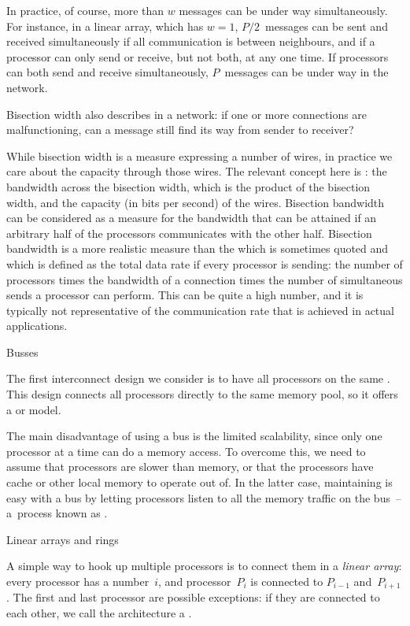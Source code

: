 In practice, of course, more than
$w$ messages can be under way simultaneously. For instance, in a
linear array, which has $w=1$, $P/2$~messages can be sent and received
simultaneously if all communication is between neighbours, and if a
processor can only send or receive, but not both, at any one time. If
processors can both send and receive simultaneously, $P$~messages can
be under way in the network.

Bisection width also describes  in a network: if
one or more connections are malfunctioning, can a message
still find its way from sender to receiver?

While bisection width is a measure expressing a number of wires, in
practice we care about the capacity through those wires. The relevant
concept here is : the bandwidth across
the bisection width, which is the product of the bisection width, and
the capacity (in bits per second) of the wires.  
%
Bisection bandwidth
can be considered as a measure for the bandwidth that can be attained
if an arbitrary half of the processors communicates with the other
half.
Bisection bandwidth is a more realistic measure than the
 which is sometimes quoted
and which is defined
as the  total data rate if every processor is sending: the number of
processors times the bandwidth of a connection times the number of
simultaneous sends a processor can perform. This can be quite
a high number, and it is typically not representative of the
communication rate that is achieved in actual applications.

 {Busses}

The first interconnect design we consider is to have all processors
on the same . This design connects
all processors directly to the same memory pool, so it offers
a  or  model.

The main disadvantage of using a bus is the limited scalability,
since only one processor at a time can do a memory access. To overcome this,
we need to assume that processors are slower than memory,
or that the processors have cache or other local memory to operate out of.
In the latter case, maintaining 
is easy with a bus by letting processors listen to all the memory traffic
on the bus~-- a~process known as .

 {Linear arrays and rings}

A simple way to hook up multiple processors is to connect them in a
\emph{linear array}: every processor has a number~$i$, and
processor~$P_i$ is connected to $P_{i-1}$ and~$P_{i+1}$. The first and
last processor are possible exceptions: if they are connected to each
other, we call the architecture a .

